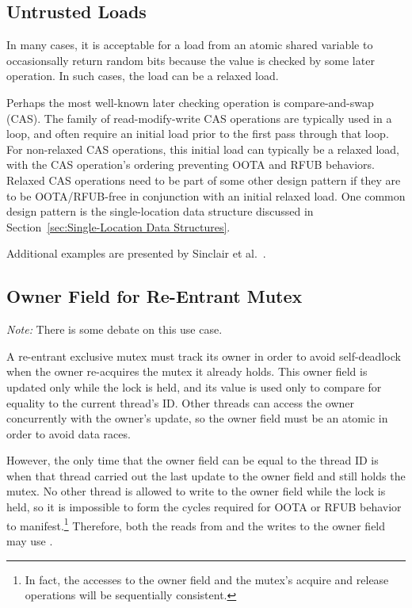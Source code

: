 \documentclass{article}
\begin{document}
\subsection{Untrusted Loads}
\label{sec:Untrusted Loads}

In many cases, it is acceptable for a load from an atomic shared variable
to occasionsally return random bits because the value is checked by
some later operation.
In such cases, the load can be a relaxed load.

Perhaps the most well-known later checking operation is compare-and-swap (CAS).
The  family of read-modify-write
CAS operations are typically used in a loop, and often require an initial
load prior to the first pass through that loop.
For non-relaxed CAS operations, this initial load can typically be a
relaxed load, with the CAS operation's ordering preventing OOTA and RFUB
behaviors.
Relaxed CAS operations need to be part of some other design pattern if they
are to be OOTA/RFUB-free in conjunction with an initial relaxed load.
One common design pattern is the single-location data structure discussed in
Section~\ref{sec:Single-Location Data Structures}.

Additional examples are presented by
Sinclair et al.~\cite{Sinclair:2017:CAR:3079856.3080206}.

\subsection{Owner Field for Re-Entrant Mutex}
\label{sec:Owner Field for Re-Entrant Mutex}

\emph{Note:} There is some debate on this use case.

A re-entrant exclusive mutex must track its owner in order to avoid
self-deadlock when the owner re-acquires the mutex it already holds.
This owner field is updated only while the lock is held, and its value
is used only to compare for equality to the current thread's ID.
Other threads can access the owner concurrently with the owner's
update, so the owner field must be an atomic in order to avoid data races.

However, the only time that the owner field can be equal to the thread ID
is when that thread carried out the last update to the owner field and
still holds the mutex.
No other thread is allowed to write to the owner field while the lock
is held, so it is impossible to form the cycles required for OOTA or
RFUB behavior to manifest.\footnote{
	In fact, the accesses to the owner field and the mutex's acquire
	and release operations will be sequentially consistent.}
Therefore, both the reads from and the writes to the owner field
may use .
\end{document}
